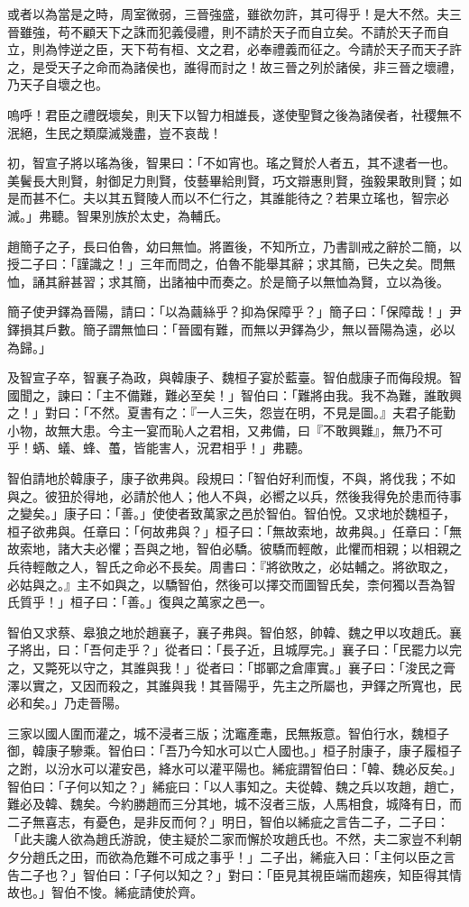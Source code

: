     或者以為當是之時，周室微弱，三晉強盛，雖欲勿許，其可得乎！是大不然。夫三晉雖強，苟不顧天下之誅而犯義侵禮，則不請於天子而自立矣。不請於天子而自立，則為悖逆之臣，天下苟有桓、文之君，必奉禮義而征之。今請於天子而天子許之，是受天子之命而為諸侯也，誰得而討之！故三晉之列於諸侯，非三晉之壞禮，乃天子自壞之也。

    嗚呼！君臣之禮旣壞矣，則天下以智力相雄長，遂使聖賢之後為諸侯者，社稷無不泯絕，生民之類糜滅幾盡，豈不哀哉！

初，智宣子將以瑤為後，智果曰：「不如宵也。瑤之賢於人者五，其不逮者一也。美鬢長大則賢，射御足力則賢，伎藝畢給則賢，巧文辯惠則賢，強毅果敢則賢；如是而甚不仁。夫以其五賢陵人而以不仁行之，其誰能待之？若果立瑤也，智宗必滅。」弗聽。智果別族於太史，為輔氏。

趙簡子之子，長曰伯魯，幼曰無恤。將置後，不知所立，乃書訓戒之辭於二簡，以授二子曰：「謹識之！」三年而問之，伯魯不能舉其辭；求其簡，已失之矣。問無恤，誦其辭甚習；求其簡，出諸袖中而奏之。於是簡子以無恤為賢，立以為後。

簡子使尹鐸為晉陽，請曰：「以為繭絲乎？抑為保障乎？」簡子曰：「保障哉！」尹鐸損其戶數。簡子謂無恤曰：「晉國有難，而無以尹鐸為少，無以晉陽為遠，必以為歸。」

及智宣子卒，智襄子為政，與韓康子、魏桓子宴於藍臺。智伯戲康子而侮段規。智國聞之，諫曰：「主不備難，難必至矣！」智伯曰：「難將由我。我不為難，誰敢興之！」對曰：「不然。夏書有之：『一人三失，怨豈在明，不見是圖。』夫君子能勤小物，故無大患。今主一宴而恥人之君相，又弗備，曰『不敢興難』，無乃不可乎！蜹、蟻、蜂、蠆，皆能害人，況君相乎！」弗聽。

智伯請地於韓康子，康子欲弗與。段規曰：「智伯好利而愎，不與，將伐我；不如與之。彼狃於得地，必請於他人；他人不與，必嚮之以兵，然後我得免於患而待事之變矣。」康子曰：「善。」使使者致萬家之邑於智伯。智伯悅。又求地於魏桓子，桓子欲弗與。任章曰：「何故弗與？」桓子曰：「無故索地，故弗與。」任章曰：「無故索地，諸大夫必懼；吾與之地，智伯必驕。彼驕而輕敵，此懼而相親；以相親之兵待輕敵之人，智氏之命必不長矣。周書曰：『將欲敗之，必姑輔之。將欲取之，必姑與之。』主不如與之，以驕智伯，然後可以擇交而圖智氏矣，柰何獨以吾為智氏質乎！」桓子曰：「善。」復與之萬家之邑一。

智伯又求蔡、皋狼之地於趙襄子，襄子弗與。智伯怒，帥韓、魏之甲以攻趙氏。襄子將出，曰：「吾何走乎？」從者曰：「長子近，且城厚完。」襄子曰：「民罷力以完之，又斃死以守之，其誰與我！」從者曰：「邯鄲之倉庫實。」襄子曰：「浚民之膏澤以實之，又因而殺之，其誰與我！其晉陽乎，先主之所屬也，尹鐸之所寬也，民必和矣。」乃走晉陽。

三家以國人圍而灌之，城不浸者三版；沈竈產鼃，民無叛意。智伯行水，魏桓子御，韓康子驂乘。智伯曰：「吾乃今知水可以亡人國也。」桓子肘康子，康子履桓子之跗，以汾水可以灌安邑，絳水可以灌平陽也。絺疵謂智伯曰：「韓、魏必反矣。」智伯曰：「子何以知之？」絺疵曰：「以人事知之。夫從韓、魏之兵以攻趙，趙亡，難必及韓、魏矣。今約勝趙而三分其地，城不沒者三版，人馬相食，城降有日，而二子無喜志，有憂色，是非反而何？」明日，智伯以絺疵之言告二子，二子曰：「此夫讒人欲為趙氏游說，使主疑於二家而懈於攻趙氏也。不然，夫二家豈不利朝夕分趙氏之田，而欲為危難不可成之事乎！」二子出，絺疵入曰：「主何以臣之言告二子也？」智伯曰：「子何以知之？」對曰：「臣見其視臣端而趨疾，知臣得其情故也。」智伯不悛。絺疵請使於齊。

